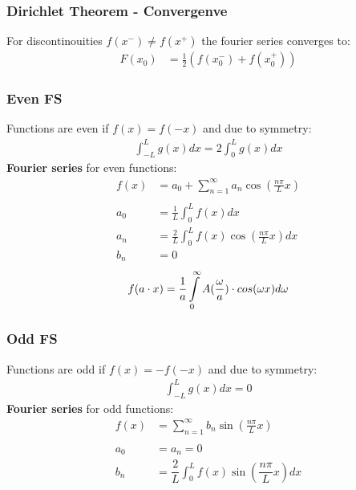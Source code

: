 \subsubsection{Dirichlet Theorem - Convergenve}
For discontinouities $f(x^-)\neq f(x^+)$ the fourier series converges to:
\begin{align*}
    F(x_0)&=\frac12(f(x_0^-)+f(x_0^+))
\end{align*}

\subsubsection{Even FS}
Functions are even if $f(x)=f(-x)$ and due to symmetry:
\begin{align*}
    \int_{-L}^Lg(x)dx=2\int_0^Lg(x)dx
\end{align*}
\textbf{Fourier series} for even functions:
\begin{align*}
    f(x)&=a_0+\sum_{n=1}^{\infty}a_n\cos\left(\frac{n\pi}{L}x\right) \\ \\
    a_{0} &=\frac{1}{L}\int_{0}^{L}f(x)dx  \\
    a_{n} &=\frac2L\int_0^Lf(x)\cos\left(\frac{n\pi}Lx\right)dx \\
    b_{n} &=0
\end{align*}
\begin{align*}
    f(a\cdot x)=\frac1a\intop_0^\infty A(\frac\omega a)\cdot cos(\omega x)d\omega 
\end{align*}
\subsubsection{Odd FS}
Functions are odd if $f(x)=-f(-x)$ and due to symmetry:
\begin{align*}
    \int_{-L}^Lg(x)dx=0
\end{align*}
\textbf{Fourier series} for odd functions:
\begin{align*}
    f(x)&=\sum_{n=1}^\infty b_n\sin\left(\frac{n\pi}Lx\right) \\ \\
    a_0 &= a_n = 0\\
    b_n&=\dfrac{2}{L}\int_0^Lf(x)\sin\left(\dfrac{n\pi}{L}x\right)dx
\end{align*}

